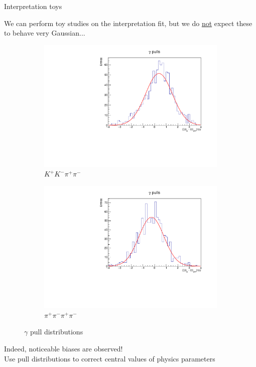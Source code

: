 \documentclass[xcolor={dvipsnames}]{beamer}
\begin{document}
\begin{frame}{Interpretation toys}
  \begin{center}
    We can perform toy studies on the interpretation fit, but we do \underline{not} expect these to behave very Gaussian...
  \end{center}
  \begin{figure}
    \centering
    \begin{subfigure}{0.5\textwidth}
      \centering
      \includegraphics[width=1.0\textwidth]{Plots/gamma_pull_toys_KKpipi.pdf}
      \vspace{-0.3cm}
      \caption*{$K^+K^-\pi^+\pi^-$}
    \end{subfigure}%
    \begin{subfigure}{0.5\textwidth}
      \centering
      \includegraphics[width=1.0\textwidth]{Plots/gamma_pull_toys_pipipipi.pdf}
      \vspace{-0.3cm}
      \caption*{$\pi^+\pi^-\pi^+\pi^-$}
    \end{subfigure}
    \vspace{-0.5cm}
    \caption*{$\gamma$ pull distributions}
  \end{figure}
  \vspace{-0.3cm}
  \begin{center}
    Indeed, noticeable biases are observed!\\
    Use pull distributions to correct central values of physics parameters
  \end{center}
\end{frame}
\end{document}
